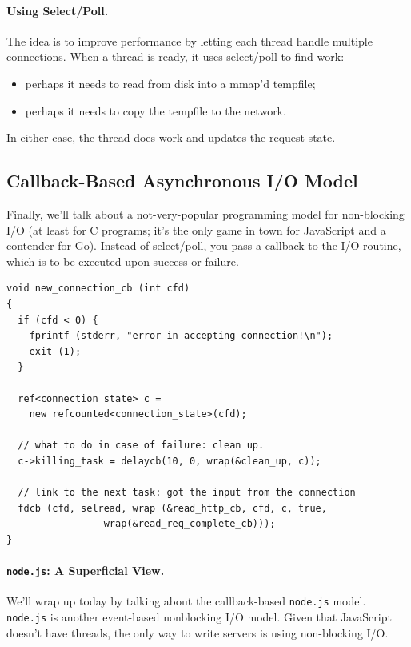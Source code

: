 \paragraph{Using Select/Poll.} The idea is to improve performance
by letting each thread handle multiple connections.
When a thread is ready, it uses select/poll to find work:
    \begin{itemize}
      \item perhaps it needs to read from disk into a mmap'd tempfile;
      \item perhaps it needs to copy the tempfile to the network.
    \end{itemize}

In either case, the thread does work and updates the request state.

\subsection*{Callback-Based Asynchronous I/O Model}
Finally, we'll talk about a not-very-popular programming model for
non-blocking I/O (at least for C programs; it's the only game in town
for JavaScript and a contender for Go).  Instead of select/poll, you
pass a callback to the I/O routine, which is to be executed upon
success or failure.

\begin{verbatim}
void new_connection_cb (int cfd)
{
  if (cfd < 0) {
    fprintf (stderr, "error in accepting connection!\n");
    exit (1);
  }

  ref<connection_state> c = 
    new refcounted<connection_state>(cfd);

  // what to do in case of failure: clean up.
  c->killing_task = delaycb(10, 0, wrap(&clean_up, c));

  // link to the next task: got the input from the connection
  fdcb (cfd, selread, wrap (&read_http_cb, cfd, c, true,
                 wrap(&read_req_complete_cb)));
}
\end{verbatim}


\paragraph{{\tt node.js}: A Superficial View.} We'll wrap up today 
by talking about the callback-based {\tt node.js} model.
{\tt node.js} is another event-based nonblocking I/O model.
Given that JavaScript doesn't have threads, the only way to write servers
is using non-blocking I/O.

